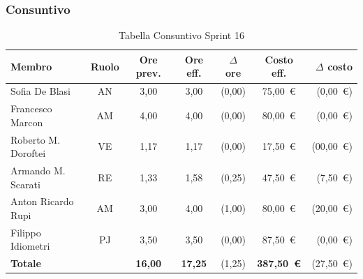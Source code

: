 \subsubsection{Consuntivo}
\begin{table}[H]
    \centering
    \renewcommand{\arraystretch}{1.3}
    \begin{tabularx}{\textwidth}{|X|c|c|c|c|c|r|}
        \hline
        \textbf{Membro} & \textbf{Ruolo} & \textbf{Ore prev.} &
        \textbf{Ore eff.} & \textbf{$\Delta$ ore} &
        \textbf{Costo eff.} & \textbf{$\Delta$ costo} \\
        \hline
        Sofia De Blasi       & AN & 3,00 & 3,00 & {\color{green}(0,00)}  & 75{,}00~\euro & {\color{green}(0{,}00~\euro)} \\
        Francesco Marcon     & AM & 4,00 & 4,00 & {\color{green}(0,00)}  & 80{,}00~\euro & {\color{green}(0{,}00~\euro)} \\
        Roberto M. Doroftei  & VE & 1,17 & 1,17 & {\color{green}(0,00)} & 17{,}50~\euro & {\color{green}(00{,}00~\euro)} \\
        Armando M. Scarati   & RE & 1,33 & 1,58 & {\color{red}(0,25)} & 47{,}50~\euro & {\color{red}(7{,}50~\euro)} \\
        Anton Ricardo Rupi   & AM & 3,00 & 4,00 & {\color{red}(1,00)} & 80{,}00~\euro & {\color{red}(20{,}00~\euro)} \\
        Filippo Idiometri    & PJ & 3,50 & 3,50 & {\color{green}(0,00)} & 87{,}50~\euro & {\color{green}(0{,}00~\euro)} \\
        \hline
        \textbf{Totale} & & \textbf{16,00} & \textbf{17,25} & {\color{red}(1,25)} & \textbf{387{,}50~\euro} & {\color{red}(27{,}50~\euro)} \\
        \hline
    \end{tabularx}
    \caption{Tabella Consuntivo Sprint 16}
\end{table}

